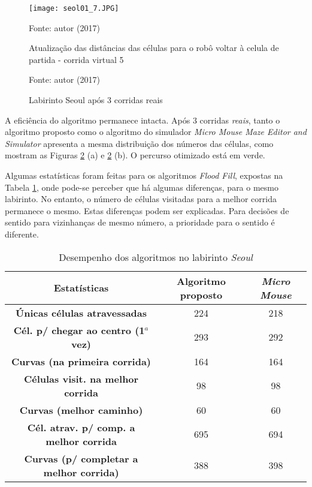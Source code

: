 \begin{figure}[!htb]
	\caption{\label{fig:seoul01_7}Atualização das distâncias das células para o robô voltar à celula de partida - corrida virtual 5}
	\begin{center}
		\texttt{[image: seol01\_7.JPG]}
	\end{center}
	\centering
	\small Fonte: autor (2017)
\end{figure}


\begin{figure}[!htb]
	\caption[Labirinto \emph{Seoul} após 3 corridas \emph{reais}]{\label{fig:seoul01_8}Labirinto Seoul após 3 corridas reais}
	\begin{center}
		\hspace*{0.1\linewidth}
	\end{center}
	\centering
	\small Fonte: autor (2017)
\end{figure}

A eficiência do algoritmo permanece intacta. Após 3 corridas \emph{reais}, tanto o algoritmo proposto como o algoritmo do simulador \emph{Micro Mouse Maze Editor and Simulator} apresenta a mesma distribuição dos números das células, como mostram as Figuras \ref{fig:seoul01_8} (a) e \ref{fig:seoul01_8} (b). O percurso otimizado está em verde.

Algumas estatísticas foram feitas para os algoritmos \emph{Flood Fill}, expostas na Tabela \ref{tab:estatistica1}, onde pode-se perceber que há algumas diferenças, para o mesmo labirinto. No entanto, o número de células visitadas para a melhor corrida permanece o mesmo. Estas diferenças podem ser explicadas. Para decisões de sentido para vizinhanças de mesmo número, a prioridade para o sentido é diferente.



\begin{table}[!htb]
	\centering
	\caption{\label{tab:estatistica1}Desempenho dos algoritmos no labirinto \emph{Seoul}}
\begin{tabular}{c|cc}
\textbf{Estatísticas} & \textbf{Algoritmo proposto}  & \textbf{\emph{Micro Mouse}} \\ 
\hline 
\textbf{Únicas células atravessadas} & 224 & 218 \\ 
\hline 
\textbf{Cél. p/ chegar ao centro (1$^a$ vez)} & 293 & 292\\ 
\hline 
\textbf{Curvas (na primeira corrida)} & 164 & 164\\ 
\hline 
\textbf{Células visit. na melhor corrida} & 98 &  98\\ 
\hline 
\textbf{Curvas (melhor caminho)} & 60 & 60 \\ 
\hline 
\textbf{Cél. atrav. p/ comp. a melhor corrida} & 695 & 694 \\ 
\hline 
\textbf{Curvas (p/ completar a melhor corrida)} & 388 & 398 \\ 
\end{tabular} 
	
\end{table}



